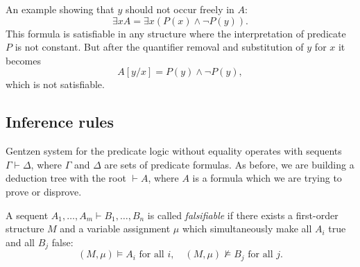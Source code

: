 \begin{page}


An example showing that $y$ should not occur freely in $A$:
\[
\exists x A = \exists x (P(x) \wedge \neg P(y)).
\]
This formula is satisfiable in any structure where the interpretation of predicate $P$ is not constant.
But after the quantifier removal and substitution of $y$ for $x$ it becomes
\[
A[y/x] = P(y) \wedge \neg P(y),
\]
which is not satisfiable.








\end{page}

\begin{page}

\subsection{Inference rules}
Gentzen system for the predicate logic without equality operates with sequents $\Gamma \vdash \Delta$,
where $\Gamma$ and $\Delta$ are sets of predicate formulas.
As before, we are building a deduction tree with the root $\vdash A$,
where $A$ is a formula which we are trying to prove or disprove.


\end{page}

\begin{page}

\begin{dfn}
A sequent $A_1, \ldots, A_m \vdash B_1, \ldots, B_n$ is called \emph{falsifiable}
if there exists a first-order structure $M$ and a variable assignment $\mu$ which simultaneously make all $A_i$ true and all $B_j$ false:
\[
(M,\mu) \vDash A_i \text{ for all }i, \quad (M,\mu) \not\vDash B_j \text{ for all }j.
\]
\end{dfn}

\end{page}

